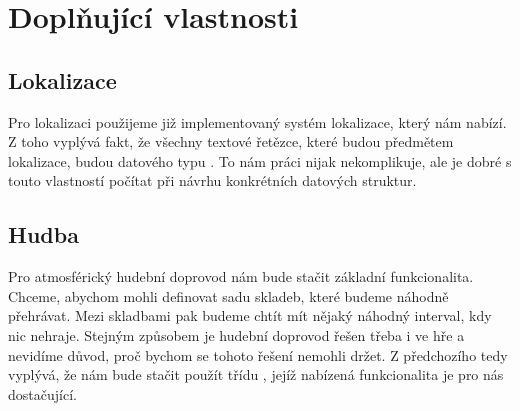 
\section{Doplňující vlastnosti}



\subsection{Lokalizace}

Pro lokalizaci použijeme již implementovaný systém lokalizace, který nám \UE{} nabízí. Z toho vyplývá fakt, že všechny textové řetězce, které budou předmětem lokalizace, budou datového typu . To nám práci nijak nekomplikuje, ale je dobré s touto vlastností počítat při návrhu konkrétních datových struktur.

\subsection{Hudba}

Pro atmosférický hudební doprovod nám bude stačit základní funkcionalita. Chceme, abychom mohli definovat sadu skladeb, které budeme náhodně přehrávat. Mezi skladbami pak budeme chtít mít nějaký náhodný interval, kdy nic nehraje. Stejným způsobem je hudební doprovod řešen třeba i ve hře \MC{} a nevidíme důvod, proč bychom se tohoto řešení nemohli držet. Z předchozího tedy vyplývá, že nám bude stačit použít třídu , jejíž nabízená funkcionalita je pro nás dostačující.
